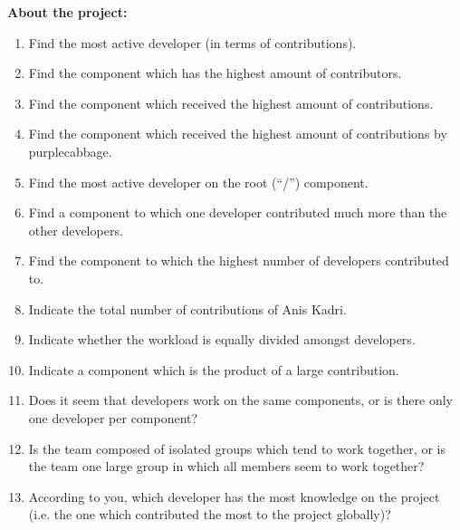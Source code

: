 \textbf{About the project:}
\begin{enumerate}
\item Find the most active developer (in terms of contributions).
\item Find the component which has the highest amount of contributors.
\item Find the component which received the highest amount of contributions.
\item Find the component which received the highest amount of contributions by purplecabbage.
\item Find the most active developer on the root (“/”) component.
\item Find a component to which one developer contributed much more than the other developers.
\item Find the component to which the highest number of developers contributed to.
\item Indicate the total number of contributions of Anis Kadri.
\item Indicate whether the workload is equally divided amongst developers.
\item Indicate a component which is the product of a large contribution.
\item Does it seem that developers work on the same components, or is there only one developer per component?
\item Is the team composed of isolated groups which tend to work together, or is the team one large group in which all members seem to work together?
\item According to you, which developer has the most knowledge on the project (i.e. the one which contributed the most to the project globally)?
\end{enumerate}